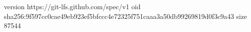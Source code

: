 version https://git-lfs.github.com/spec/v1
oid sha256:9f597cc0cae49eb923ef5bfccc4e72325f751caaa3a50db99269819d0f3c9a43
size 87544
